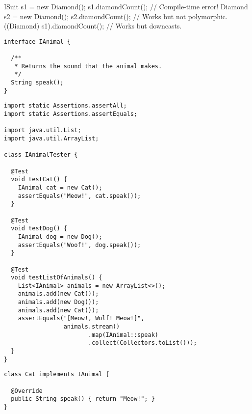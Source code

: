 \begin{verbnobox}[\small]
ISuit s1 = new Diamond();
s1.diamondCount();             // Compile-time error!
Diamond s2 = new Diamond();
s2.diamondCount();             // Works but not polymorphic.
((Diamond) s1).diamondCount(); // Works but downcasts.
\end{verbnobox}


\begin{lstlisting}[language=MyJava]
interface IAnimal {

  /**
   * Returns the sound that the animal makes.
   */
  String speak();
}
\end{lstlisting}

\begin{lstlisting}[language=MyJava]
import static Assertions.assertAll;
import static Assertions.assertEquals;

import java.util.List;
import java.util.ArrayList;

class IAnimalTester {
  
  @Test
  void testCat() {
    IAnimal cat = new Cat();
    assertEquals("Meow!", cat.speak());
  }

  @Test
  void testDog() {
    IAnimal dog = new Dog();
    assertEquals("Woof!", dog.speak());
  }

  @Test
  void testListOfAnimals() {
    List<IAnimal> animals = new ArrayList<>();
    animals.add(new Cat());
    animals.add(new Dog());
    animals.add(new Cat());
    assertEquals("[Meow!, Wolf! Meow!]", 
                 animals.stream()
                        .map(IAnimal::speak)
                        .collect(Collectors.toList()));
  }
}
\end{lstlisting}

\begin{lstlisting}[language=MyJava]
class Cat implements IAnimal {

  @Override
  public String speak() { return "Meow!"; }
}
\end{lstlisting}

